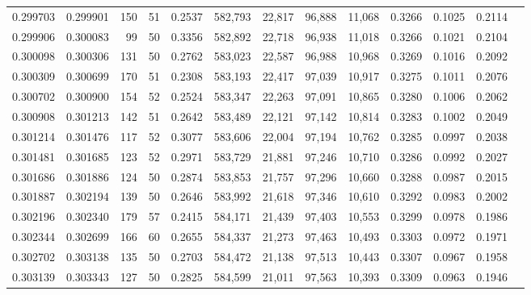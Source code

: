 \begin{tabular}{rrrrrrrrrrrrr}
0.299703 & 0.299901 &   150 &  51 &                                     0.2537 & 582,793 &  22,817 &  96,888 &  11,068 & 0.3266 & 0.1025 & 0.2114 \\
0.299906 & 0.300083 &    99 &  50 &                                     0.3356 & 582,892 &  22,718 &  96,938 &  11,018 & 0.3266 & 0.1021 & 0.2104 \\
0.300098 & 0.300306 &   131 &  50 &                                     0.2762 & 583,023 &  22,587 &  96,988 &  10,968 & 0.3269 & 0.1016 & 0.2092 \\
0.300309 & 0.300699 &   170 &  51 &                                     0.2308 & 583,193 &  22,417 &  97,039 &  10,917 & 0.3275 & 0.1011 & 0.2076 \\
0.300702 & 0.300900 &   154 &  52 &                                     0.2524 & 583,347 &  22,263 &  97,091 &  10,865 & 0.3280 & 0.1006 & 0.2062 \\
0.300908 & 0.301213 &   142 &  51 &                                     0.2642 & 583,489 &  22,121 &  97,142 &  10,814 & 0.3283 & 0.1002 & 0.2049 \\
0.301214 & 0.301476 &   117 &  52 &                                     0.3077 & 583,606 &  22,004 &  97,194 &  10,762 & 0.3285 & 0.0997 & 0.2038 \\
0.301481 & 0.301685 &   123 &  52 &                                     0.2971 & 583,729 &  21,881 &  97,246 &  10,710 & 0.3286 & 0.0992 & 0.2027 \\
0.301686 & 0.301886 &   124 &  50 &                                     0.2874 & 583,853 &  21,757 &  97,296 &  10,660 & 0.3288 & 0.0987 & 0.2015 \\
0.301887 & 0.302194 &   139 &  50 &                                     0.2646 & 583,992 &  21,618 &  97,346 &  10,610 & 0.3292 & 0.0983 & 0.2002 \\
0.302196 & 0.302340 &   179 &  57 &                                     0.2415 & 584,171 &  21,439 &  97,403 &  10,553 & 0.3299 & 0.0978 & 0.1986 \\
0.302344 & 0.302699 &   166 &  60 &                                     0.2655 & 584,337 &  21,273 &  97,463 &  10,493 & 0.3303 & 0.0972 & 0.1971 \\
0.302702 & 0.303138 &   135 &  50 &                                     0.2703 & 584,472 &  21,138 &  97,513 &  10,443 & 0.3307 & 0.0967 & 0.1958 \\
0.303139 & 0.303343 &   127 &  50 &                                     0.2825 & 584,599 &  21,011 &  97,563 &  10,393 & 0.3309 & 0.0963 & 0.1946 \\

\end{tabular}
